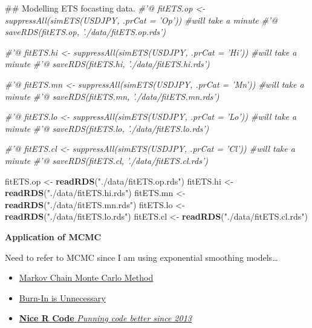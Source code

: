 \documentclass[]{tufte-book}
\newenvironment{Shaded}{}{}
\newcommand{\KeywordTok}[1]{\textcolor[rgb]{0.00,0.44,0.13}{\textbf{#1}}}
\newcommand{\StringTok}[1]{\textcolor[rgb]{0.25,0.44,0.63}{#1}}
\newcommand{\CommentTok}[1]{\textcolor[rgb]{0.38,0.63,0.69}{\textit{#1}}}
\newcommand{\NormalTok}[1]{#1}
\providecommand{\tightlist}{%
  \setlength{\itemsep}{0pt}\setlength{\parskip}{0pt}}
\begin{document}
\begin{Shaded}
\begin{Highlighting}[]
\NormalTok{## Modelling ETS focasting data.}
\CommentTok{#'@ fitETS.op <- suppressAll(simETS(USDJPY, .prCat = 'Op')) #will take a minute}
\CommentTok{#'@ saveRDS(fitETS.op, './data/fitETS.op.rds')}

\CommentTok{#'@ fitETS.hi <- suppressAll(simETS(USDJPY, .prCat = 'Hi')) #will take a minute}
\CommentTok{#'@ saveRDS(fitETS.hi, './data/fitETS.hi.rds')}

\CommentTok{#'@ fitETS.mn <- suppressAll(simETS(USDJPY, .prCat = 'Mn')) #will take a minute}
\CommentTok{#'@ saveRDS(fitETS.mn, './data/fitETS.mn.rds')}

\CommentTok{#'@ fitETS.lo <- suppressAll(simETS(USDJPY, .prCat = 'Lo')) #will take a minute}
\CommentTok{#'@ saveRDS(fitETS.lo, './data/fitETS.lo.rds')}

\CommentTok{#'@ fitETS.cl <- suppressAll(simETS(USDJPY, .prCat = 'Cl')) #will take a minute}
\CommentTok{#'@ saveRDS(fitETS.cl, './data/fitETS.cl.rds')}

\NormalTok{fitETS.op <-}\StringTok{ }\KeywordTok{readRDS}\NormalTok{(}\StringTok{"./data/fitETS.op.rds"}\NormalTok{)}
\NormalTok{fitETS.hi <-}\StringTok{ }\KeywordTok{readRDS}\NormalTok{(}\StringTok{"./data/fitETS.hi.rds"}\NormalTok{)}
\NormalTok{fitETS.mn <-}\StringTok{ }\KeywordTok{readRDS}\NormalTok{(}\StringTok{"./data/fitETS.mn.rds"}\NormalTok{)}
\NormalTok{fitETS.lo <-}\StringTok{ }\KeywordTok{readRDS}\NormalTok{(}\StringTok{"./data/fitETS.lo.rds"}\NormalTok{)}
\NormalTok{fitETS.cl <-}\StringTok{ }\KeywordTok{readRDS}\NormalTok{(}\StringTok{"./data/fitETS.cl.rds"}\NormalTok{)}
\end{Highlighting}
\end{Shaded}

\textbf{Application of MCMC}

Need to refer to MCMC since I am using exponential smoothing
models\ldots{}

\begin{itemize}
\tightlist
\item
  \href{https://support.sas.com/documentation/cdl/en/statug/63033/HTML/default/viewer.htm\#statug_introbayes_sect007.htm}{{Markov
  Chain Monte Carlo Method}}
\item
  \href{http://users.stat.umn.edu/~geyer/mcmc/burn.html}{{Burn-In is
  Unnecessary}}
\item
  \href{https://nicercode.github.io/guides/mcmc/}{{\textbf{Nice R Code}
  \emph{Punning code better since 2013}}}
\end{itemize}
\end{document}
